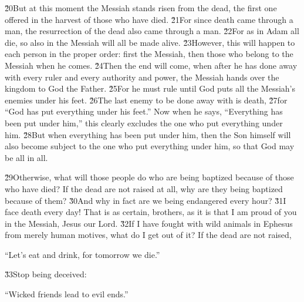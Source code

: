 \v{20}But at this moment the Messiah stands risen from the dead, the first one offered in the harvest of those who have died. \v{21}For since death came through a man, the resurrection of the dead also came through a man. \v{22}For as in Adam all die, so also in the Messiah will all be made alive. \v{23}However, this will happen to each person in the proper order: first the Messiah, then those who belong to the Messiah when he comes. \v{24}Then the end will come, when after he has done away with every ruler and every authority and power, the Messiah hands over the kingdom to God the Father. \v{25}For he must rule until God puts all the Messiah's enemies under his feet. \v{26}The last enemy to be done away with is death, \v{27}for ``God has put everything under his feet.'' Now when he says, ``Everything has been put under him,'' this clearly excludes the one who put everything under him. \v{28}But when everything has been put under him, then the Son himself will also become subject to the one who put everything under him, so that God may be all in all.

\v{29}Otherwise, what will those people do who are being baptized because of those who have died? If the dead are not raised at all, why are they being baptized because of them? \v{30}And why in fact are we being endangered every hour? \v{31}I face death every day! That is as certain, brothers, as it is that I am proud of you in the Messiah, Jesus our Lord. \v{32}If I have fought with wild animals in Ephesus from merely human motives, what do I get out of it? If the dead are not raised,

\begin{poetry}
\poeml ``Let's eat and drink, for tomorrow we die.''
\end{poetry}

\v{33}Stop being deceived:

\begin{poetry}
\poeml ``Wicked friends lead to evil ends.''
\end{poetry}

